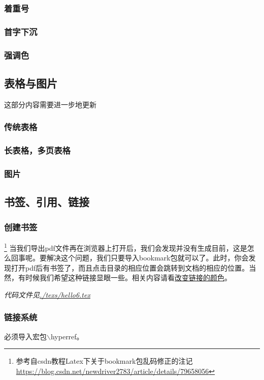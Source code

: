 \documentclass{article}
\begin{document}
            \subsubsection{着重号}
            \subsubsection{首字下沉}
            \subsubsection{强调色}
        \subsection{表格与图片}
            这部分内容需要进一步地更新
            \subsubsection{传统表格}
            \subsubsection{长表格，多页表格}
            \subsubsection{图片}
        \subsection{书签、引用、链接}
            \subsubsection{创建书签}
                \footnote{参考自csdn教程Latex下关于bookmark包乱码修正的注记\url{https://blog.csdn.net/newdriver2783/article/details/79658056}}
                当我们导出pdf文件再在浏览器上打开后，我们会发现并没有生成目前，这是怎么回事呢。要解决这个问题，我们只要导入bookmark包就可以了。此时，你会发现打开pdf后有书签了，而且点击目录的相应位置会跳转到文档的相应的位置。当然，有时候我们希望这种链接显眼一些。相关内容请看\hyperlink{changelinkcolor}{改变链接的颜色}。

                
                \textit{代码文件见\url{./texs/hello6.tex}}

            \hypertarget{author}{}
            \subsubsection{链接系统}
                必须导入宏包$\backslash$hyperref。
                
\end{document}
